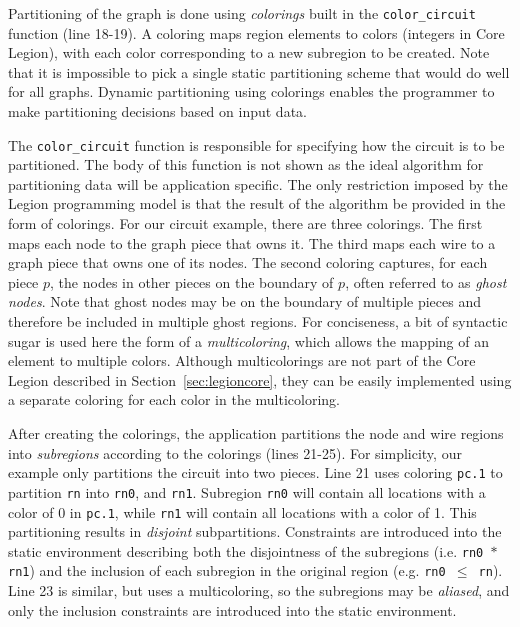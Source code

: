 Partitioning of the graph is done using {\em colorings} built in the
{\tt color\_circuit} function (line 18-19).  A coloring maps region
elements to colors (integers in Core Legion), with each color corresponding
 to a new subregion
to be created.  Note that it is impossible to pick a single static
partitioning scheme that would do well for all graphs.  Dynamic
partitioning using colorings enables the programmer 
to make partitioning decisions based on input data.

The {\tt color\_circuit} function is responsible for specifying how the
circuit is to be partitioned.  The body of this function is not shown as the
ideal algorithm for partitioning data will be application specific.  The 
only restriction imposed by the Legion programming model is that the result of
the algorithm be provided in the form of colorings.  For our circuit example,
there are three colorings.  The first maps each node to the graph piece that owns it.
The third maps each wire to a graph piece that
owns one of its nodes.  The second coloring captures, for each piece $p$,
the nodes in other pieces on the boundary of $p$, often referred to as
{\em ghost nodes}.  
Note that 
ghost nodes may be on the boundary of multiple pieces and therefore be included in
multiple ghost regions.  For conciseness, a bit of syntactic sugar is used here the
form of a {\em multicoloring}, which allows the mapping of an element to multiple 
colors.  Although multicolorings are not part of the Core Legion described in 
Section~\ref{sec:legioncore}, they can be easily implemented using a separate 
coloring for each color in the multicoloring.

After creating the colorings, the application partitions the node and wire
regions into {\em subregions} according to the colorings (lines 21-25).  For
simplicity, our example only partitions the circuit into two pieces.
Line 21 uses coloring {\tt pc.1} to partition {\tt rn} into {\tt rn0}, and {\tt rn1}.
Subregion {\tt rn0} will contain all locations with a color of 0 in {\tt pc.1},
while {\tt rn1} will contain all locations with a color of 1.  This
partitioning results in {\em disjoint} subpartitions.
Constraints are introduced into the static environment describing both the
disjointness of the subregions (i.e. {\tt rn0 $*$ rn1}) and the inclusion of
each subregion in the original region (e.g. {\tt rn0 $\leq$ rn}).  Line
23 is similar, but uses a multicoloring, so the subregions may be {\em aliased},
and only the inclusion constraints are introduced into the static environment.

